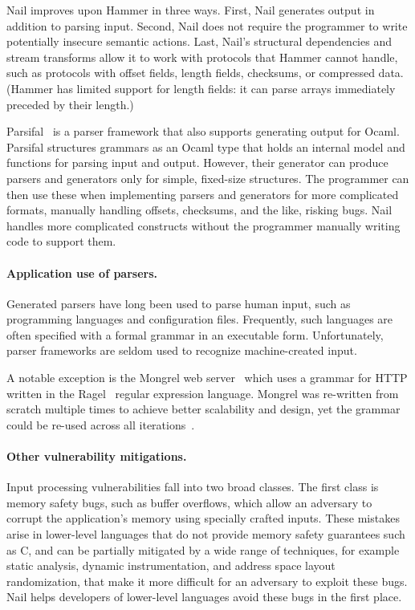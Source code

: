 Nail improves upon Hammer in three ways.  First, Nail generates output in
addition to parsing input.  Second, Nail does not require the programmer
to write potentially insecure semantic actions.  Last, Nail's structural
dependencies and stream transforms allow it to work with protocols that
Hammer cannot handle, such as protocols with offset fields, length fields,
checksums, or compressed data.  (Hammer has limited support for length
fields: it can parse arrays immediately preceded by their length.)

Parsifal~\cite{ANSSI:parsifal} is a parser framework that also supports
generating output for Ocaml.  Parsifal structures grammars as an Ocaml
type that holds an internal model and functions for parsing input and
output.  However, their generator can produce parsers and generators
only for simple, fixed-size structures.  The programmer can then use
these when implementing parsers and generators for more complicated
formats, manually handling offsets, checksums, and the like, risking bugs.
Nail handles more complicated constructs without the programmer manually
writing code to support them.

\paragraph{Application use of parsers.}
Generated parsers have long been used to parse human input, such as programming languages and
configuration files. Frequently, such languages are often specified with a formal grammar in an
executable form. Unfortunately,  parser frameworks are seldom used  to recognize
machine-created input.

A notable exception is the Mongrel
web server~\cite{mongrel} which uses a grammar
for HTTP written in the Ragel~\cite{ragel-paper} regular expression
language. Mongrel was re-written from scratch multiple times to achieve
better scalability and design, yet the grammar could be  re-used across
all iterations~\cite{patterson-citation}.

\paragraph{Other vulnerability mitigations.}

Input processing vulnerabilities fall into two broad classes.  The first
class is memory safety bugs, such as buffer overflows, which allow an
adversary to corrupt the application's memory using specially crafted
inputs.  These mistakes arise in lower-level languages that do not
provide memory safety guarantees such as C, and can be partially
mitigated by a wide range of techniques, for example static analysis,
dynamic instrumentation, and address space layout randomization, that
make it more difficult for an adversary to exploit these bugs.
Nail helps developers of lower-level languages avoid these bugs
in the first place.

